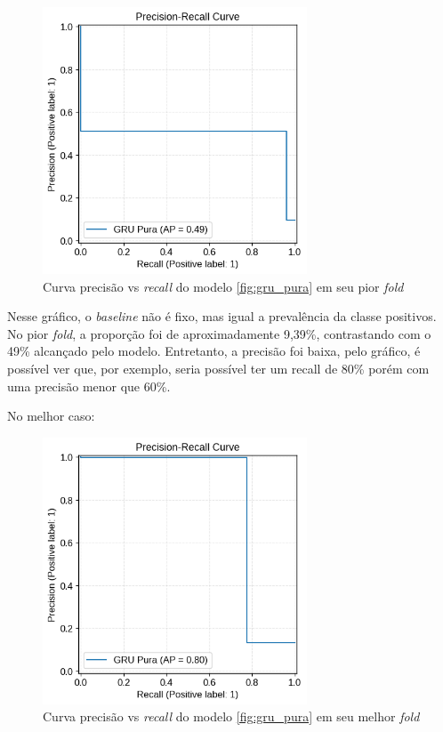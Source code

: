 \documentclass[
    12pt,                %
    openright,           %
    oneside,             %
    a4paper,             %
    brazil               %
]{abntex2}
\begin{document}
\begin{figure}[H]
  \centering
   \includegraphics[width=0.7\textwidth]{figuras/modelos_resultados/gru/ap_gru_pior_fold.png} %
  \caption{Curva precisão vs \textit{recall} do modelo \ref{fig:gru_pura} em seu pior \textit{fold}}
  \label{fig:ap_gru_pior_fold}
\end{figure}

Nesse gráfico, o \textit{baseline} não é fixo, mas igual a prevalência da classe positivos. No pior \textit{fold}, a proporção foi de aproximadamente
9,39\%, contrastando com o 49\% alcançado pelo modelo. Entretanto, a precisão foi baixa, pelo gráfico, é possível ver que, por exemplo, seria 
possível ter um recall de 80\% porém com uma precisão menor que 60\%.

No melhor caso:

\begin{figure}[H]
  \centering
   \includegraphics[width=0.7\textwidth]{figuras/modelos_resultados/gru/ap_gru_melhor_fold.png} %
  \caption{Curva precisão vs \textit{recall} do modelo \ref{fig:gru_pura} em seu melhor \textit{fold}}
  \label{fig:ap_gru_melhor_fold}
\end{figure}
\end{document}
